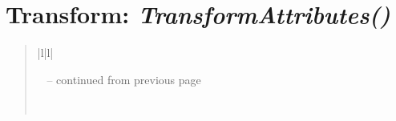 \documentclass[letterpaper,10pt,english]{sphinxmanual}
\begin{document}
\section{\textbf{Transform}: \emph{TransformAttributes()}}
\label{attributes:transform-transformattributes}
\begin{DUlineblock}{0em}
\item[] 
\end{DUlineblock}
\begin{quote}

\begin{longtable}{|l|l|}
\hline
\endfirsthead

%
{{\textsf{\tablename\ \thetable{} -- continued from previous page}}} \\
\hline
\endhead

\hline {} \\ \hline
\endfoot

\endlastfoot



\end{longtable}
\end{quote}
\end{document}
